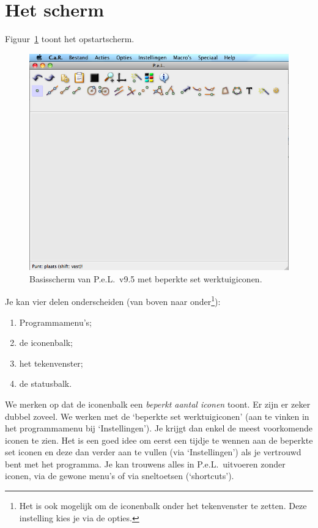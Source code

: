 \section{Het scherm}
Figuur~\ref{fig:PeLscherm} toont het opstartscherm. 
\begin{figure}[htb]
    \centering
    \includegraphics[width=\textwidth]{figuren/PeL/PeLscherm.png}
       \caption{Basisscherm van P.e.L.\ v9.5 met beperkte set werktuigiconen.}
    \label{fig:PeLscherm}
\end{figure}
Je kan vier delen onderscheiden (van boven naar onder\footnote{Het is ook mogelijk om de iconenbalk onder het tekenvenster te zetten. Deze instelling kies je via de opties.}):
\begin{enumerate}
\item Programmamenu's;
\item de iconenbalk;
\item het tekenvenster;
\item de statusbalk.
\end{enumerate}
We merken op dat de iconenbalk een \emph{beperkt aantal iconen} toont. Er zijn er zeker dubbel zoveel. We werken met de `beperkte set werktuigiconen' (aan te vinken in het programmamenu bij `Instellingen'). Je krijgt dan enkel de meest voorkomende iconen te zien. Het is een goed idee om eerst een tijdje te wennen aan de beperkte set iconen en deze dan verder aan te vullen (via `Instellingen') als je vertrouwd bent met het programma. Je kan trouwens alles in P.e.L.\ uitvoeren zonder iconen, via de gewone menu's of via  sneltoetsen (`shortcuts').

